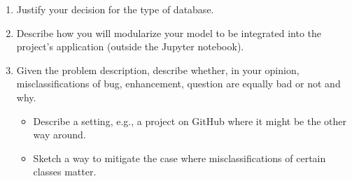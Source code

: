 \begin{enumerate}
      \item
            Justify your decision for the type of database.
      \item
            Describe how you will modularize your model to be integrated into the project's application (outside the Jupyter notebook).
      \item
            Given the problem description, describe whether, in your opinion, misclassifications of bug, enhancement, question are equally bad or not and why.
            \begin{itemize}
                  \item
                        Describe a setting, e.g., a project on GitHub where it might be the other way around.
                  \item
                        Sketch a way to mitigate the case where misclassifications of certain classes matter.
            \end{itemize}
\end{enumerate}


